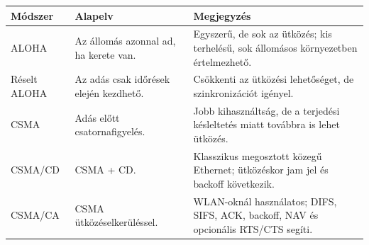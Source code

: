 
\begin{tabularx}{\textwidth}{L{24mm}L{34mm}X}
\toprule
\textbf{Módszer} & \textbf{Alapelv} & \textbf{Megjegyzés} \\
\midrule
ALOHA & Az állomás azonnal ad, ha kerete van. & Egyszerű, de sok az ütközés; kis terhelésű, sok állomásos környezetben értelmezhető. \\
Réselt ALOHA & Az adás csak időrések elején kezdhető. & Csökkenti az ütközési lehetőséget, de szinkronizációt igényel. \\
CSMA & Adás előtt csatornafigyelés. & Jobb kihasználtság, de a terjedési késleltetés miatt továbbra is lehet ütközés. \\
CSMA/CD & CSMA + CD. & Klasszikus megosztott közegű Ethernet; ütközéskor jam jel és backoff következik. \\
CSMA/CA & CSMA ütközéselkerüléssel. & WLAN-oknál használatos; DIFS, SIFS, ACK, backoff, NAV és opcionális RTS/CTS segíti. \\
\bottomrule
\end{tabularx}
